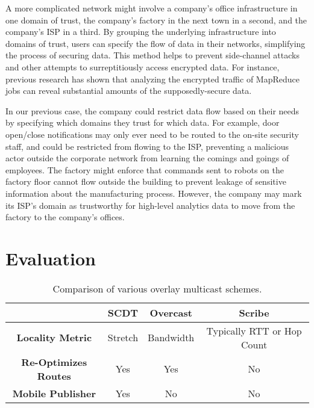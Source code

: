 A more complicated network might involve a company's office infrastructure in one domain of trust, the company's factory in the next town in a second, and the company's ISP in a third. By grouping the underlying infrastructure into domains of trust, users can specify the flow of data in their networks, simplifying the process of securing data. This method helps to prevent side-channel attacks and other attempts to surreptitiously access encrypted data. For instance, previous research \cite{sidechannel} has shown that analyzing the encrypted traffic of MapReduce jobs can reveal substantial amounts of the supposedly-secure data.

In our previous case, the company could restrict data flow based on their needs by specifying which domains they trust for which data. For example, door open/close notifications may only ever need to be routed to the on-site security staff, and could be restricted from flowing to the ISP, preventing a malicious actor outside the corporate network from learning the comings and goings of employees. The factory might enforce that commands sent to robots on the factory floor cannot flow outside the building to prevent leakage of sensitive information about the manufacturing process. However, the company may mark its ISP's domain as trustworthy for high-level analytics data to move from the factory to the company's offices. 

\section{Evaluation}
\label{scdt-eval}
\begin{table}
	\begin{center}
		\begin{tabular}{|c|c|c|c|}
			\hline
			& \textbf{SCDT} & \textbf{Overcast} & \textbf{Scribe} \\
			\hline
			\textbf{Locality Metric} & Stretch & Bandwidth & Typically RTT or Hop Count \\
			\hline
			\textbf{Re-Optimizes Routes} & Yes & Yes & No \\
			\hline
			\textbf{Mobile Publisher} & Yes & No & No \\
			\hline
		\end{tabular}
	\end{center}
	\caption{Comparison of various overlay multicast schemes.}
\end{table}

